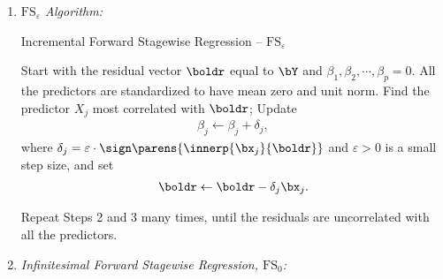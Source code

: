 \documentclass[12pt]{article}
\begin{document}
\begin{enumerate}[label=\textbf{\arabic*.}]
	\begin{enumerate}
	
	\item \textit{$\mathrm{FS}_{\varepsilon}$ Algorithm:}
	
	\begin{minipage}{\linewidth}
		\begin{algorithm}[H]
			\caption{Incremental Forward Stagewise Regression -- $\mathrm{FS}_{\varepsilon}$}\label{algo-incre-for-stagewise}
			\begin{algorithmic}[1]
			\STATE Start with the residual vector $\boldr$ equal to $\bY$ and $\beta_1, \beta_2, \cdots, \beta_p = 0$. All the predictors are standardized to have mean zero and unit norm. 
			\STATE Find the predictor $X_j$ most correlated with $\boldr$; 
			\STATE Update 
			\begin{align*}
				\beta_j \leftarrow \beta_j + \delta_j, 
			\end{align*}
			where $\delta_j = \varepsilon \cdot \sign \parens{ \innerp{\bx_j}{\boldr}}$ and $\varepsilon > 0$ is a small step size, and set 
			\begin{align*}
				\boldr \leftarrow \boldr - \delta_j \bx_j. 
			\end{align*}
			
			\STATE Repeat Steps 2 and 3 many times, until the residuals are uncorrelated with all the predictors. 
		\end{algorithmic}
		\end{algorithm}
	\end{minipage}
	
	\vspace{10pt}
	
	\item \textit{Infinitesimal Forward Stagewise Regression, $\mathrm{FS}_0$:} 
	

\end{enumerate}
\end{enumerate}
\end{document}
